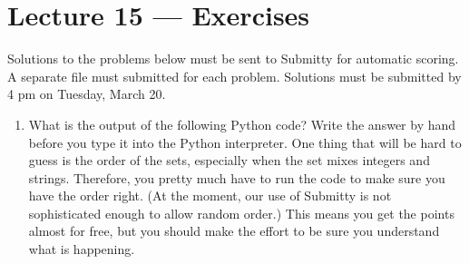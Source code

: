 \documentclass[letterpaper,10pt,english]{sphinxmanual}
\begin{document}
\chapter{Lecture 15 — Exercises}
\label{\detokenize{lecture_notes/lec15_sets_exercises/exercises:lecture-15-exercises}}\label{\detokenize{lecture_notes/lec15_sets_exercises/exercises::doc}}
Solutions to the problems below must be sent to Submitty for
automatic scoring.  A separate file must submitted for each problem.
Solutions must be submitted by 4 pm on Tuesday, March 20.
\begin{enumerate}
\item {} 
What is the output of the following Python code? Write the answer by
hand before you type it into the Python interpreter.  One thing
that will be hard to guess is the order of the sets, especially
when the set mixes integers and strings.  Therefore, you pretty
much have to run the code to make sure you have the order right.
(At the moment, our use of Submitty is not sophisticated enough to
allow random order.)  This means you get the points almost for
free, but you should make the effort to be sure you understand what
is happening.

%
\begin{sphinxVerbatim}[commandchars=\\\{\}]
  \PYG{p}{[}\PYG{p}{]}
  
 

 

    
 

   
\end{sphinxVerbatim}


\end{enumerate}
\end{document}
